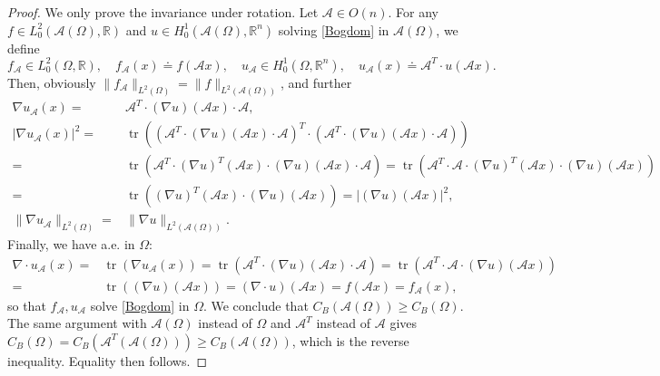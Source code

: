 \documentclass[11pt]{article}
\theoremstyle{plain}
\theoremstyle{definition}
\numberwithin{equation}{section}
\newcommand{\R}{\mathbb{R}}
\begin{document}
\noindent
\begin{proof}We only prove the invariance under rotation. Let $\mathcal{A}\in O(n)$. For any $f\in L^2_0 (\mathcal{A}(\Omega), \mathbb{R})$ and $u\in H^1_0 (\mathcal{A}(\Omega),\R^n)$
	solving \eqref{Bogdom} in $\mathcal{A}(\Omega)$, we define
	$$
	f_\mathcal{A}\in L^2_0(\Omega,\R),\quad f_\mathcal{A}(x)\doteq f(\mathcal{A}x),\quad u_\mathcal{A}\in H^1_0 (\Omega,\R^n),\quad u_\mathcal{A}(x)\doteq \mathcal{A}^T \cdot u(\mathcal{A}x).
	$$
	Then, obviously $\|f_\mathcal{A} \|_{L^2(\Omega )}=\|f \|_{L^2(\mathcal{A}(\Omega) )}$, and further
	\begin{align*}
	\nabla u_\mathcal{A}(x) =& \mathcal{A}^T \cdot (\nabla u)(\mathcal{A}x)\cdot \mathcal{A},\\
	|\nabla u_\mathcal{A}(x)|^2=& \operatorname{tr} \left( \left( \mathcal{A}^T \cdot (\nabla u)(\mathcal{A}x)\cdot \mathcal{A}\right)^T\cdot \left(\mathcal{A}^T \cdot (\nabla u)(\mathcal{A}x)\cdot \mathcal{A}\right)\right)\\
	=& \operatorname{tr} \left(\mathcal{A}^T \cdot  (\nabla u)^T(\mathcal{A}x)\cdot(\nabla u)(\mathcal{A}x)\cdot \mathcal{A} \right)
	=\operatorname{tr} \left(\mathcal{A}^T \cdot \mathcal{A}\cdot  (\nabla u)^T(\mathcal{A}x)\cdot(\nabla u)(\mathcal{A}x) \right) \\
	=&\operatorname{tr} \left(  (\nabla u)^T(\mathcal{A}x)\cdot(\nabla u)(\mathcal{A}x) \right)=|(\nabla u)(\mathcal{A}x)|^2,\\
	\|\nabla u_\mathcal{A} \|_{L^2(\Omega )}=&\|\nabla u \|_{L^2(\mathcal{A}(\Omega) )}.
	\end{align*}
	Finally, we have a.e. in $\Omega$:
	\begin{align*}
	\nabla \cdot u_\mathcal{A} (x) =&\operatorname{tr} \left(\nabla  u_\mathcal{A} (x)\right)
	= \operatorname{tr} \left(  \mathcal{A}^T \cdot (\nabla u)(\mathcal{A}x)\cdot \mathcal{A}\right)
	= \operatorname{tr} \left(  \mathcal{A}^T \cdot \mathcal{A}\cdot (\nabla u)(\mathcal{A}x)\right)\\
	=&\operatorname{tr} \left(  (\nabla u)(\mathcal{A}x)\right)
	=(\nabla \cdot u)(\mathcal{A}x)=f(\mathcal{A}x) =f_\mathcal{A}(x),
	\end{align*}
	so that $f_\mathcal{A},u_\mathcal{A}$ solve \eqref{Bogdom} in $\Omega$.
	We conclude that $C_B(\mathcal{A}(\Omega))\ge C_B(\Omega)$. The same argument with $\mathcal{A}(\Omega)$ instead of $\Omega$ and $\mathcal{A}^T$ instead of $\mathcal{A}$ gives
	$C_B(\Omega)=C_B(\mathcal{A}^T(\mathcal{A}(\Omega)))\ge C_B(\mathcal{A}(\Omega))$, which is the reverse inequality. Equality then follows.	
\end{proof}
\end{document}
